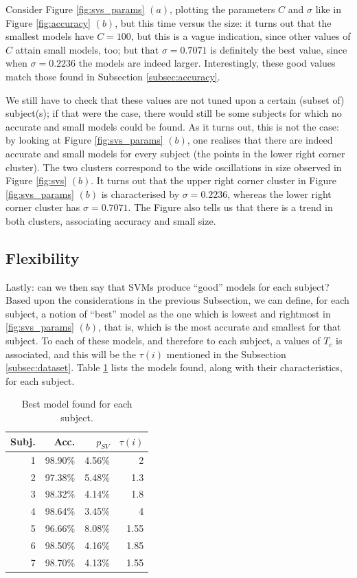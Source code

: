 \documentclass[a4paper,10pt,conference]{ieeeconf}
\begin{document}
Consider Figure \ref{fig:svs_params} $(a)$, plotting the parameters
$C$ and $\sigma$ like in Figure \ref{fig:accuracy} $(b)$, but this
time versus the size: it turns out that the smallest models have
$C=100$, but this is a vague indication, since other values of $C$
attain small models, too; but that $\sigma=0.7071$ is definitely the
best value, since when $\sigma=0.2236$ the models are indeed
larger. Interestingly, these good values match those found in
Subsection \ref{subsec:accuracy}.

We still have to check that these values are not tuned upon a certain
(subset of) subject(s); if that were the case, there would still be
some subjects for which no accurate and small models could be
found. As it turns out, this is not the case: by looking at Figure
\ref{fig:svs_params} $(b)$, one realises that there are indeed
accurate and small models for every subject (the points in the lower
right corner cluster). The two clusters correspond to the wide
oscillations in size observed in Figure \ref{fig:svs} $(b)$. It turns
out that the upper right corner cluster in Figure \ref{fig:svs_params}
$(b)$ is characterised by $\sigma=0.2236$, whereas the lower right
corner cluster has $\sigma=0.7071$. The Figure also tells us that
there is a trend in both clusters, associating accuracy and small
size.

\subsection{Flexibility}

Lastly: can we then say that SVMs produce ``good'' models for each
subject? Based upon the considerations in the previous Subsection, we
can define, for each subject, a notion of ``best'' model as the one
which is lowest and rightmost in \ref{fig:svs_params} $(b)$, that is,
which is the most accurate and smallest for that subject. To each of
these models, and therefore to each subject, a values of $T_c$ is
associated, and this will be the $\tau(i)$ mentioned in the Subsection
\ref{subsec:dataset}. Table \ref{tab:tau} lists the models found,
along with their characteristics, for each subject.

\begin{table}[!t]
  \centering
    \caption{Best model found for each subject.}
    \begin{tabular}{|r|r|r|r|}
      \hline
      Subj. & Acc. & $p_{SV}$ & $\tau(i)$ \\
      \hline
      1 & 98.90\% & 4.56\% & 2   \\
      2 & 97.38\% & 5.48\% & 1.3 \\
      3 & 98.32\% & 4.14\% & 1.8 \\
      4 & 98.64\% & 3.45\% & 4   \\
      5 & 96.66\% & 8.08\% & 1.55\\
      6 & 98.50\% & 4.16\% & 1.85\\
      7 & 98.70\% & 4.13\% & 1.55\\
      \hline
    \end{tabular}
    \label{tab:tau}
\end{table}
\end{document}
